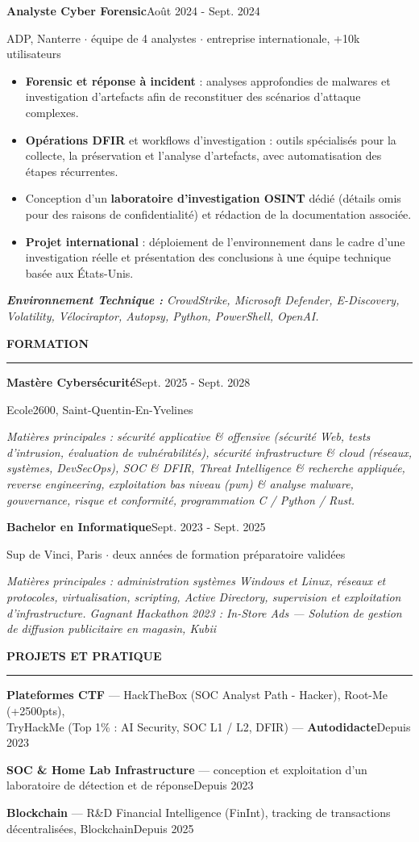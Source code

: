 \documentclass[10pt,a4paper]{article}
\newlength{\gBeforeSec}  \setlength{\gBeforeSec}  {4.2pt}  %
\newlength{\gSecRule}    \setlength{\gSecRule}    {1.2pt}  %
\newlength{\gRuleBody}   \setlength{\gRuleBody}   {1.9pt}  %
\newlength{\gEntry}      \setlength{\gEntry}      {2.4pt}  %
\newcommand{\cvsection}[1]{%
  \vspace{\gBeforeSec}%
  {\large\bfseries #1}\par
  \vspace{\gSecRule}%
  \hrule
  \vspace{\gRuleBody}%
}
\newcommand{\cventry}[3]{%
  \vspace{\gEntry}%
  \textbf{#1}\hfill #2\par
  #3\par
}
\newenvironment{cvitems}{%
  \begin{itemize}[leftmargin=14.9pt, labelsep=8.4pt, labelwidth=0pt,
                  align=left, itemsep=0pt, topsep=0pt, parsep=0pt,
                  partopsep=0pt, label={\makebox[0pt][l]{\textbullet}}]%
}{\end{itemize}}
\newcommand{\cvline}[3]{\vspace{\gEntry}\textbf{#1} — #2\hfill #3\par}
\newcommand{\envtech}[1]{%
  {\small\textit{\textbf{Environnement Technique :} #1}\par}%
}
\newcommand{\coursework}[1]{{\small\textit{#1}\par}}
\newcommand{\sep}{\ensuremath{\cdot}}
\begin{document}
\cventry{Analyste Cyber Forensic}{Août 2024 - Sept. 2024}{ADP, Nanterre \sep{} équipe de 4 analystes \sep{} entreprise internationale, +10k utilisateurs}
\begin{cvitems}
  \item \textbf{Forensic et réponse à incident} : analyses approfondies de
        malwares et investigation d'artefacts afin de reconstituer des scénarios
        d'attaque complexes.
  \item \textbf{Opérations DFIR} et workflows d'investigation : outils
        spécialisés pour la collecte, la préservation et l'analyse d'artefacts,
        avec automatisation des étapes récurrentes.
  \item Conception d'un \textbf{laboratoire d'investigation OSINT} dédié
        (détails omis pour des raisons de confidentialité) et rédaction de la
        documentation associée.
  \item \textbf{Projet international} : déploiement de
        l'environnement dans le cadre d'une investigation réelle et présentation
        des conclusions à une équipe technique basée aux États-Unis.
\end{cvitems}
\envtech{CrowdStrike, Microsoft Defender, E-Discovery, Volatility, Vélociraptor, Autopsy, Python, PowerShell, OpenAI.}

\cvsection{FORMATION}

\cventry{Mastère Cybersécurité}{Sept. 2025 - Sept. 2028}{Ecole2600, Saint-Quentin-En-Yvelines}
\coursework{Matières principales : sécurité applicative \& offensive (sécurité Web, tests d'intrusion, évaluation de vulnérabilités), sécurité infrastructure \&
cloud (réseaux, systèmes, DevSecOps), SOC \& DFIR, Threat Intelligence \& recherche
appliquée, reverse engineering, exploitation bas niveau (pwn) \& analyse malware,  gouvernance, risque et conformité, programmation C / Python / Rust.}

\cventry{Bachelor en Informatique}{Sept. 2023 - Sept. 2025}{Sup de Vinci, Paris \sep{} deux années de formation préparatoire validées}
\coursework{Matières principales : administration systèmes Windows et Linux,
réseaux et protocoles, virtualisation, scripting, Active Directory, supervision
et exploitation d'infrastructure. Gagnant Hackathon 2023 : In-Store Ads — Solution de gestion de diffusion publicitaire en magasin, Kubii}

\cvsection{PROJETS ET PRATIQUE}

\cvline{Plateformes CTF}{HackTheBox (SOC Analyst Path - Hacker), Root-Me (+2500pts), \\TryHackMe (Top 1\% : AI Security, SOC L1 / L2, DFIR) — \textbf{Autodidacte}}{Depuis 2023}
\cvline{SOC \& Home Lab Infrastructure}{conception et exploitation d'un laboratoire de détection et de réponse}{Depuis 2023}
\cvline{Blockchain}{R\&D Financial Intelligence (FinInt), tracking de transactions décentralisées, Blockchain}{Depuis 2025}
\end{document}
